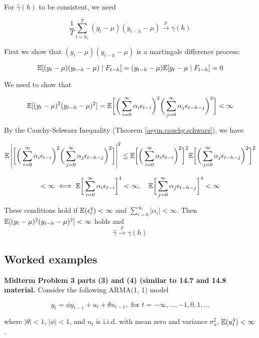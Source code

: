 For \(\hat{\gamma}(h)\) to be consistent, we need

\[
\frac{1}{T}\sum_{t=h_1}^T (y_t - \mu)(y_{t-h} - \mu) \xrightarrow{p} \gamma(h) 
\]

First we show that \((y_t - \mu)(y_{t-h} - \mu)\) is a martingale difference process:

\[
\mathbb{E}[(y_t - \mu)(y_{t-h} - \mu) \mid F_{t-h}] =(y_{t-h} - \mu)  \mathbb{E}[y_t - \mu \mid F_{t-h}] = 0
\]


We need to show that

\[
\mathbb{E}[(y_t - \mu)^2(y_{t-h} - \mu)^2 ] = \mathbb{E} \bigg[ \bigg( \sum_{i=0}^\infty \alpha_i \epsilon_{t-i} \bigg)^2 \bigg( \sum_{j=0}^\infty \alpha_j \epsilon_{t - h - j} \bigg) ^2 \bigg] < \infty
\]

By the Cauchy-Schwarz Inequality (Theorem \ref{asym.cauchy.schwarz}), we have

\[
\mathbb{E} \left| \bigg[ \bigg( \sum_{i=0}^\infty \alpha_i \epsilon_{t-i} \bigg)^2 \bigg( \sum_{j=0}^\infty \alpha_j \epsilon_{t - h - j} \bigg) ^2 \bigg] \right| ^2 \leq \mathbb{E} \bigg[ \bigg( \sum_{i=0}^\infty \alpha_i \epsilon_{t-i} \bigg)^2\bigg]^2 \mathbb{E} \bigg[ \bigg( \sum_{j=0}^\infty \alpha_j \epsilon_{t - h - j} \bigg) ^2\bigg]^2
\]

\[
< \infty \iff \mathbb{E} \bigg[ \sum_{i=0}^\infty \alpha_i \epsilon_{t-i}\bigg]^4 < \infty, \ \ \  \mathbb{E} \bigg[ \sum_{j=0}^\infty \alpha_j \epsilon_{t - h - j} \bigg]^4 < \infty
\]

These conditions hold if \(\mathbb{E}(\epsilon_t^4) < \infty\) and \(\sum_{i=0}^\infty |\alpha_i| < \infty\). Then \(\mathbb{E}[(y_t - \mu)^2(y_{t-h} - \mu)^2 ] < \infty\) holds and
\[
\hat{\gamma} \xrightarrow{p} \gamma(h)
\]



\subsection{Worked examples}

\textbf{Midterm Problem 3 parts (3) and (4) (similar to 14.7 and 14.8 material.} Consider the following ARMA(1, 1) model

\[
y_t = \phi y_{t-1} + u_t + \theta u_{t-1}, \text{ for } t = - \infty, \ldots, -1, 0 , 1, \ldots
\]

where \(|\theta| < 1\), \(|\phi| < 1\), and \(u_t\) is i.i.d. with mean zero and variance \(\sigma_u^2\), \(\mathbb{E}(u_t^4) < \infty\).

